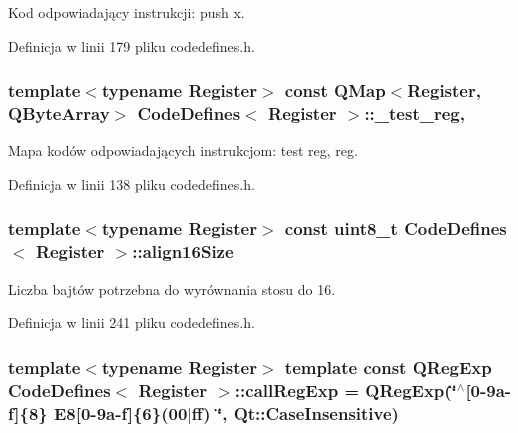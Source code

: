 Kod odpowiadający instrukcji\-: push x. 



Definicja w linii 179 pliku codedefines.\-h.

\hypertarget{class_code_defines_adb44763cfb70769e6ab1071efdb380fa}{
\subsubsection[{\-\_\-test\-\_\-reg}]{\setlength{\rightskip}{0pt plus 5cm}template$<$typename Register$>$ const Q\-Map$<$Register, Q\-Byte\-Array$>$ {\bf Code\-Defines}$<$ Register $>$\-::\-\_\-test\-\_\-reg\hspace{0.3cm}{\ttfamily [static]}, {\ttfamily [private]}}}\label{class_code_defines_adb44763cfb70769e6ab1071efdb380fa}


Mapa kodów odpowiadających instrukcjom\-: test reg, reg. 



Definicja w linii 138 pliku codedefines.\-h.

\hypertarget{class_code_defines_a83820641d7045e035f2a4619a23d2755}{
\subsubsection[{align16\-Size}]{\setlength{\rightskip}{0pt plus 5cm}template$<$typename Register$>$ const uint8\-\_\-t {\bf Code\-Defines}$<$ Register $>$\-::align16\-Size\hspace{0.3cm}{\ttfamily [static]}}}\label{class_code_defines_a83820641d7045e035f2a4619a23d2755}


Liczba bajtów potrzebna do wyrównania stosu do 16. 



Definicja w linii 241 pliku codedefines.\-h.

\hypertarget{class_code_defines_a54f3fde2a7976ac5c36b9a9aa2efb37e}{
\subsubsection[{call\-Reg\-Exp}]{\setlength{\rightskip}{0pt plus 5cm}template$<$typename Register$>$ template const Q\-Reg\-Exp {\bf Code\-Defines}$<$ Register $>$\-::call\-Reg\-Exp = Q\-Reg\-Exp(\char`\"{}$^\wedge$\mbox{[}0-\/9a-\/f\mbox{]}\{8\} E8\mbox{[}0-\/9a-\/f\mbox{]}\{6\}(00$\vert$ff) \char`\"{}, Qt\-::\-Case\-Insensitive)\hspace{0.3cm}{\ttfamily [static]}}}\label{class_code_defines_a54f3fde2a7976ac5c36b9a9aa2efb37e}


